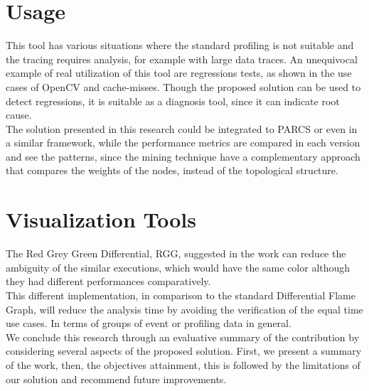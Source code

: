 \section{Usage}
This tool has various situations where the standard profiling is not suitable and the tracing requires analysis, for example with large data traces.
An unequivocal example of real utilization of this tool are regressions tests, as shown in the use cases of OpenCV and cache-misses. Though the proposed solution can be used to detect regressions, it is suitable as a diagnosis tool, since it can indicate root cause.\\
The solution presented in this research could be integrated to PARCS or even in a similar framework, while the performance metrics are compared in each version and see the patterns, since the mining technique have a complementary approach that compares the weights of the nodes, instead of the topological structure. \\
\section{Visualization Tools}
The Red Grey Green Differential, RGG, suggested in the work can reduce the ambiguity of the similar executions, which would have the same color although they had different performances comparatively. \\
This different implementation, in comparison to the standard Differential Flame Graph, will reduce the analysis time by avoiding the verification of the equal time use cases. In terms of groups of event or profiling data in general.\\
We conclude this research through an evaluative summary of the contribution by considering several aspects of the proposed solution. First, we present a summary of the work, then, the objectives attainment, this is followed by the limitations of our solution and recommend future improvements.

